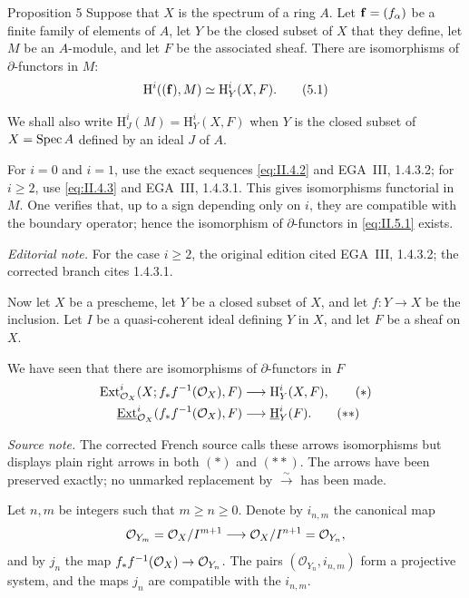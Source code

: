 \begin{sgastatement}{Proposition 5}
Suppose that $X$ is the spectrum of a ring $A$. Let
$\mathbf f=(f_\alpha)$ be a finite family of elements of $A$, let $Y$ be the
closed subset of $X$ that they define, let $M$ be an $A$-module, and let $F$
be the associated sheaf. There are isomorphisms of $\partial$-functors in
$M$:
\begin{equation}
  \mathrm H^i((\mathbf f),M)\simeq \mathrm H_Y^i(X,F).
  \tag{5.1}\label{eq:II.5.1}
\end{equation}
\end{sgastatement}

We shall also write
$\mathrm H_J^i(M)=\mathrm H_Y^i(X,F)$ when $Y$ is the closed subset of
$X=\operatorname{Spec} A$ defined by an ideal $J$ of $A$.

For $i=0$ and $i=1$, use the exact sequences
\eqref{eq:II.4.2} and EGA~III, 1.4.3.2; for $i\geq2$, use
\eqref{eq:II.4.3} and EGA~III, 1.4.3.1. This gives isomorphisms functorial in
$M$. One verifies that, up to a sign depending only on $i$, they are
compatible with the boundary operator; hence the isomorphism of
$\partial$-functors in \eqref{eq:II.5.1} exists.

\noindent\textit{Editorial note.} For the case $i\geq2$, the original
edition cited EGA~III, 1.4.3.2; the corrected branch cites 1.4.3.1.

Now let $X$ be a prescheme, let $Y$ be a closed subset of $X$, and let
$f\colon Y\to X$ be the inclusion. Let $I$ be a quasi-coherent ideal defining
$Y$ in $X$, and let $F$ be a sheaf on $X$.

We have seen that there are isomorphisms of $\partial$-functors in $F$
\begin{align}
  \operatorname{Ext}_{\mathcal O_X}^i(X;f_*f^{-1}(\mathcal O_X),F)
    &\longrightarrow \mathrm H_Y^i(X,F),
    \tag{$*$}\label{eq:II.5.*}\\
  \mathop{\underline{\mathrm{Ext}}}\nolimits_{\mathcal O_X}^i(f_*f^{-1}(\mathcal O_X),F)
    &\longrightarrow \mathop{\underline{\mathrm H}}\nolimits_Y^i(F).
    \tag{$**$}\label{eq:II.5.**}
\end{align}

\noindent\textit{Source note.} The corrected French source calls these
arrows isomorphisms but displays plain right arrows in both $(*)$ and $(**)$.
The arrows have been preserved exactly; no unmarked replacement by
$\xrightarrow{\sim}$ has been made.

Let $n,m$ be integers such that $m\geq n\geq0$. Denote by $i_{n,m}$ the
canonical map
\[
  \mathcal O_{Y_m}=\mathcal O_X/I^{m+1}
  \longrightarrow \mathcal O_X/I^{n+1}=\mathcal O_{Y_n},
\]
and by $j_n$ the map
$f_*f^{-1}(\mathcal O_X)\to\mathcal O_{Y_n}$. The pairs
$(\mathcal O_{Y_n},i_{n,m})$ form a projective system, and the maps $j_n$ are
compatible with the $i_{n,m}$.

